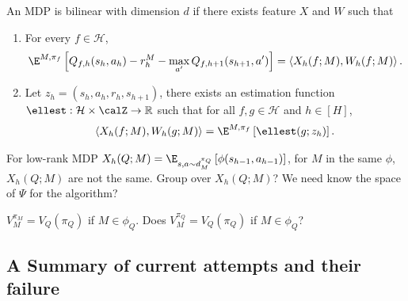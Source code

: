 \begin{definition}
An MDP is bilinear with dimension $d$ if there exists feature $X$ and $W$ such that
\begin{enumerate}
    \item For every $f \in \mathcal{H}$, 
    \begin{align*}
        \E^{M, \pi_f}\left[Q_{f,h}(s_h,a_h) - r_h^M - \max_{a'} Q_{f, h+1}(s_{h+1}, a')\right] = \left\langle X_h(f;M), W_h(f;M) \right\rangle.
    \end{align*}
    \item Let $z_h = (s_h, a_h, r_h, s_{h+1})$, there exists an estimation function $\ellest: \mathcal{H} \times \calZ \rightarrow \mathbb{R}$ such that for all $f, g \in \mathcal{H}$ and $h \in [H]$, 
    \begin{align*}
        \left\langle X_h(f;M), W_h(g;M) \right\rangle = \E^{M, \pi_f}\left[\ellest(g;z_h)\right].
    \end{align*}
\end{enumerate}
\end{definition}
For low-rank MDP $X_h(Q; M) = \E_{s,a \sim d_M^{\pi_Q}}\left[\phi(s_{h-1}, a_{h-1})\right]$, for $M$ in the same $\phi$, $X_h(Q; M)$ are not the same. Group over $X_h(Q; M)$? We need know the space of $\Psi$ for the algorithm?

$V_M^{\pi_M} = V_Q(\pi_Q)$ if $M \in \phi_Q$. Does $V_M^{\pi_Q} = V_Q(\pi_Q)$ if $M \in \phi_Q$? 


\subsection{A Summary of current attempts and their failure}
